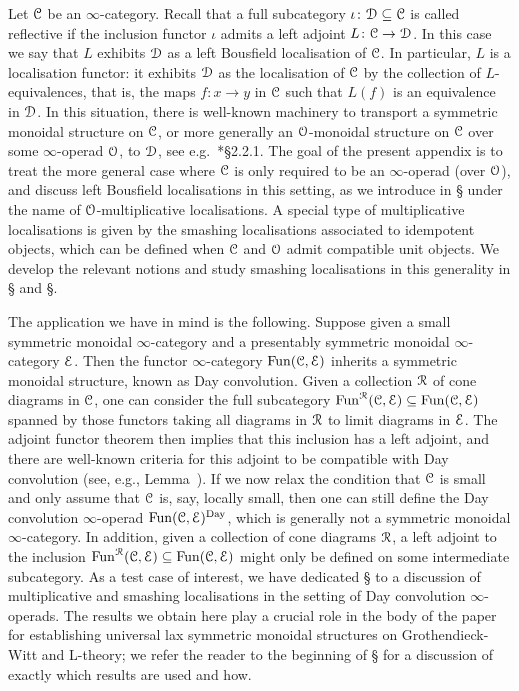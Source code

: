 
Let $\mathcal C$ be an $\infty$-category. Recall that a full subcategory $\iota\colon \mathcal{D} \subseteq \mathcal C$ is called reflective if the inclusion functor $\iota$ admits a left adjoint $L\colon \mathcal C \to \mathcal{D}$. In this case we say that $L$ exhibits $\mathcal{D}$ as a left Bousfield localisation of $\mathcal C$. In particular, $L$ is a localisation functor: it exhibits $\mathcal{D}$ as the localisation of $\mathcal C$ by the collection of $L$-equivalences, that is, the maps $f\colon x \to y$ in $\mathcal C$ such that $L(f)$ is an equivalence in $\mathcal{D}$.
In this situation, there is well-known machinery to transport a symmetric monoidal structure on $\mathcal C$, or more generally an $\mathcal{O}$-monoidal structure on $\mathcal C$ over some $\infty$-operad $\mathcal{O}$, to $\mathcal{D}$, 
see e.g.\ \cite{HA}*{\S 2.2.1}. The goal of the present appendix is to treat the more general case where $\mathcal C$ is only required to be an $\infty$-operad (over $\mathcal{O}$), and discuss left Bousfield localisations in this setting, as we introduce in \S{} under the name of $\mathcal{O}$-multiplicative localisations. A special type of multiplicative localisations is given by the smashing localisations associated to idempotent objects, which can be defined when $\mathcal C$ and $\mathcal{O}$ admit compatible unit objects. We develop the relevant notions and study smashing localisations in this generality in \S{} and 
\S{}.


The application we have in mind is the following. Suppose given a small symmetric monoidal $\infty$-category and a presentably symmetric monoidal $\infty$-category $\mathcal{E}$. Then the functor $\infty$-category $\operatorname{Fun}(\mathcal C,\mathcal{E})$ inherits a symmetric monoidal structure, known as Day convolution. Given a collection $\mathcal{R}$ of cone diagrams in $\mathcal C$, one can consider the full subcategory $\operatorname{Fun}^{\mathcal{R}}(\mathcal C,\mathcal{E}) \subseteq \operatorname{Fun}(\mathcal C,\mathcal{E})$ spanned by those functors taking all diagrams in $\mathcal{R}$ to limit diagrams in $\mathcal{E}$. The adjoint functor theorem then implies that this inclusion has a left adjoint, and there are well-known criteria for this adjoint to be compatible with Day convolution (see, e.g., Lemma~). %
If we now relax the condition that $\mathcal C$ is small and only assume that $\mathcal C$ is, say, locally small, then one can still define the Day convolution $\infty$-operad $\operatorname{Fun}(\mathcal C,\mathcal{E})^{\mathrm{Day}}$, which is generally not a symmetric monoidal $\infty$-category. In addition, given a collection of cone diagrams $\mathcal{R}$, a left adjoint to the inclusion $\operatorname{Fun}^{\mathcal{R}}(\mathcal C,\mathcal{E}) \subseteq \operatorname{Fun}(\mathcal C,\mathcal{E})$ might only be defined on some intermediate subcategory. %
As a test case of interest, we have dedicated \S{} to a discussion of multiplicative and smashing localisations in the setting of Day convolution $\infty$-operads. The results we obtain here play a crucial role in the body of the paper for establishing universal lax symmetric monoidal structures on Grothendieck-Witt and L-theory; we refer the reader to the beginning of \S{} for a discussion of exactly which results are used and how.


